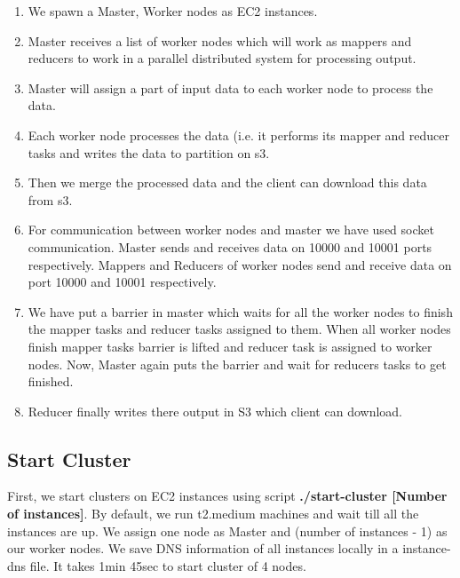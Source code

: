 \documentclass{article}
\begin{document}
\begin{enumerate}
    \item We spawn a Master, Worker nodes as EC2 instances.
    
    \item Master receives a list of worker nodes which will work as mappers and reducers to work in a parallel distributed system for processing output.

    \item Master will assign a part of input data to each worker node to process the data.

    \item  Each worker node processes the data (i.e. it performs its mapper and reducer tasks and writes the data to partition on s3.

    \item  Then we merge the processed data and the client can download this data from s3.

    \item  For communication between worker nodes and  master we have used socket communication. Master sends and receives data on 10000 and 10001 ports respectively. Mappers and Reducers of worker nodes send and receive data on port 10000 and 10001 respectively.

    \item We have put a barrier in master which waits for all the worker nodes to finish the mapper tasks and reducer tasks assigned to them. When all worker nodes finish mapper tasks barrier is lifted and reducer task is assigned to worker nodes. Now, Master again puts the barrier and wait for reducers tasks to get finished.
    
    \item Reducer finally writes there output in S3 which client can download.

\end{enumerate}

\subsection{Start Cluster}
First, we start clusters on EC2 instances using script \textbf{ ./start-cluster [Number of instances]}. By default, we run t2.medium machines and wait till all the instances are up. We assign one node as Master and (number of instances - 1) as our worker nodes. We save DNS information of all instances locally in a instance-dns file. It takes 1min 45sec to start cluster of 4 nodes.
\end{document}
